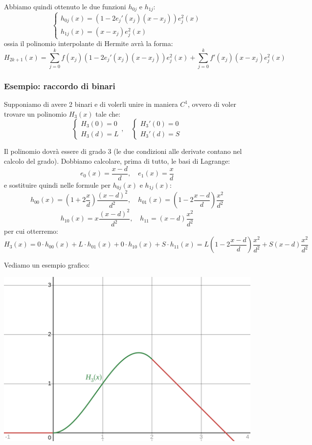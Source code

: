 \documentclass[a4paper,11pt]{article}
\begin{document}
Abbiamo quindi ottenuto le due funzioni $h_{0j}$ e $h_{1j}$:
\[
	\begin{cases}
		h_{0j}(x) = \left( 1 - 2 e_j'(x_j) (x - x_j) \right) e_j^2(x) \\
		h_{1j}(x) = (x - x_j) e^2_j(x)
	\end{cases}
\]
ossia il polinomio interpolante di Hermite avrà la forma:
$$
H_{2k + 1}(x) = \sum_{j = 0}^k f(x_j) \left( 1 - 2 e_j'(x_j)(x - x_j) \right) e_j^2(x) + \sum_{j = 0}^k f'(x_j) (x - x_j) e_j^2(x)
$$

\subsubsection{Esempio: raccordo di binari}
Supponiamo di avere 2 binari e di volerli unire in maniera $C^1$, ovvero di voler trovare un polinomio $H_3(x)$ tale che:
\[
	\begin{cases}
		H_3(0) = 0 \\
		H_3(d) = L
	\end{cases}, \quad
	\begin{cases}
		H_3'(0) = 0 \\
		H_3'(d) = S
	\end{cases} 
\]

Il polinomio dovrà essere di grado 3 (le due condizioni alle derivate contano nel calcolo del grado).
Dobbiamo calcolare, prima di tutto, le basi di Lagrange:
$$
e_0(x) = \frac{x - d}{d}, \quad e_1(x) = \frac{x}{d}
$$
e sostituire quindi nelle formule per $h_{0j}(x)$ e $h_{1j}(x)$:
$$
h_{00}(x) = \left( 1 + 2\frac{x}{d} \right) \frac{(x - d)^2}{d^2}, \quad h_{01}(x) = \left( 1 - 2 \frac{x - d}{d} \right) \frac{x^2}{d^2}
$$
$$
h_{10}(x) = x \frac{(x - d)^2}{d^2}, \quad h_{11} = (x - d) \frac{x^2}{d^2}
$$
per cui otterremo:
$$
H_3(x) = 0 \cdot h_{00}(x) + L \cdot h_{01}(x) + 0 \cdot h_{10}(x) + S \cdot h_{11}(x) = L \left( 1 - 2 \frac{x - d}{d} \right) \frac{x^2}{d^2} + S (x - d) \frac{x^2}{d^2}
$$

Vediamo un esempio grafico:
\begin{center}
	\includegraphics[scale=0.28]{../figures/tracks.png}
\end{center}
\end{document}
